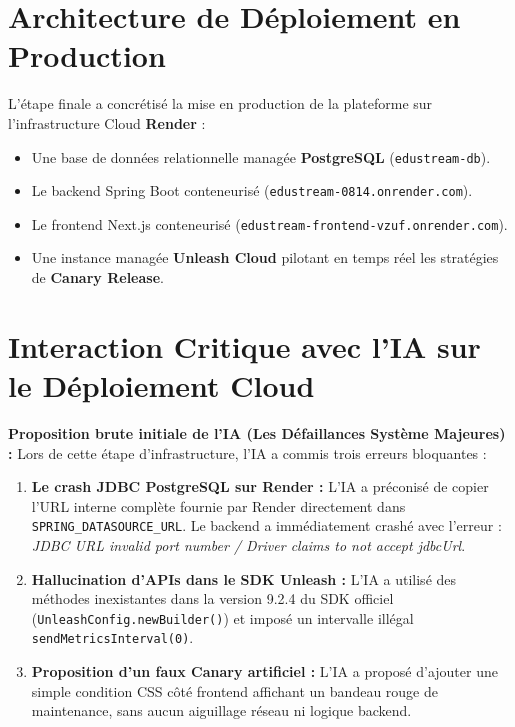 \documentclass[11pt, a4paper, openany]{report}
\begin{document}
\section{Architecture de Déploiement en Production}
L'étape finale a concrétisé la mise en production de la plateforme sur l'infrastructure Cloud \textbf{Render} :
\begin{itemize}[label=\textbullet, itemsep=2pt]
    \item Une base de données relationnelle managée \textbf{PostgreSQL} (\texttt{edustream-db}).
    \item Le backend Spring Boot conteneurisé (\texttt{edustream-0814.onrender.com}).
    \item Le frontend Next.js conteneurisé (\texttt{edustream-frontend-vzuf.onrender.com}).
    \item Une instance managée \textbf{Unleash Cloud} pilotant en temps réel les stratégies de \textbf{Canary Release}.
\end{itemize}

\section{Interaction Critique avec l'IA sur le Déploiement Cloud}

\begin{aiCritiqueBox}
\textbf{Proposition brute initiale de l'IA (Les Défaillances Système Majeures) :}
Lors de cette étape d'infrastructure, l'IA a commis trois erreurs bloquantes :
\begin{enumerate}[noitemsep]
    \item \textbf{Le crash JDBC PostgreSQL sur Render :} L'IA a préconisé de copier l'URL interne complète fournie par Render directement dans \texttt{SPRING\_DATASOURCE\_URL}. Le backend a immédiatement crashé avec l'erreur : \textit{JDBC URL invalid port number / Driver claims to not accept jdbcUrl}.
    \item \textbf{Hallucination d'APIs dans le SDK Unleash :} L'IA a utilisé des méthodes inexistantes dans la version 9.2.4 du SDK officiel (\texttt{UnleashConfig.newBuilder()}) et imposé un intervalle illégal \texttt{sendMetricsInterval(0)}.
    \item \textbf{Proposition d'un faux Canary artificiel :} L'IA a proposé d'ajouter une simple condition CSS côté frontend affichant un bandeau rouge de maintenance, sans aucun aiguillage réseau ni logique backend.
\end{enumerate}
\end{aiCritiqueBox}
\end{document}

